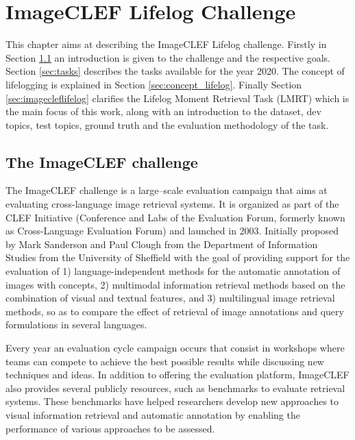 \cleardoublepage

\chapter{ImageCLEF Lifelog Challenge}
\label{ch:imageclef}

This chapter aims at describing the ImageCLEF Lifelog challenge. Firstly in Section \ref{sec:introduct} an introduction is given to the challenge and the respective goals. Section \ref{sec:tasks} describes the tasks available for the year 2020. The concept of lifelogging is explained in Section \ref{sec:concept_lifelog}. Finally Section \ref{sec:imagecleflifelog} clarifies the Lifelog Moment Retrieval Task (LMRT) which is the main focus of this work, along with an introduction to the dataset, dev topics, test topics, ground truth and the evaluation methodology of the task.



\section{The ImageCLEF challenge}
\label{sec:introduct}

The ImageCLEF challenge is a large–scale evaluation campaign that aims at evaluating cross-language image retrieval systems. It is organized as part of the CLEF Initiative (Conference and Labs of the Evaluation Forum, formerly known as Cross-Language Evaluation Forum) and launched in  2003. Initially proposed by Mark Sanderson and Paul Clough from the Department of Information Studies from the University of Sheffield with the goal of providing support for the evaluation of 1) language-independent methods for the automatic annotation of images with concepts, 2) multimodal information retrieval methods based on the combination of visual and textual features, and 3) multilingual image retrieval methods, so as to compare the effect of retrieval of image annotations and query formulations in several languages.


Every year an evaluation cycle campaign occurs that consist in workshops where teams can compete to achieve the best possible results while discussing new techniques and ideas. In addition to offering the evaluation platform, ImageCLEF also provides several publicly resources, such as benchmarks to evaluate retrieval systems. These benchmarks have helped researchers develop new approaches to visual information retrieval and automatic annotation by enabling the performance of various approaches to be assessed.

